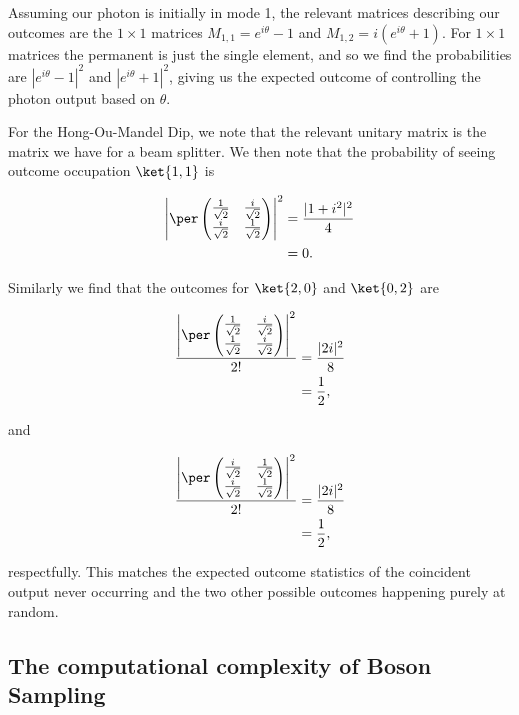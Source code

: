 Assuming our photon is initially in mode 1, the relevant matrices describing our outcomes are the $1\times 1$ matrices $M_{1,1} = e^{i\theta}-1$ and $M_{1,2} = i(e^{i\theta}+1)$. For $1\times 1$ matrices the permanent is just the single element, and so we find the probabilities are $|e^{i\theta}-1|^2$ and $|e^{i\theta}+1|^2$, giving us the expected outcome of controlling the photon output based on $\theta$.

For the Hong-Ou-Mandel Dip, we note that the relevant unitary matrix is the matrix we have for a beam splitter. We then note that the probability of seeing outcome occupation $\ket{1,1}$ is

\begin{align}
\left|\per\begin{pmatrix}\frac{1}{\sqrt{2}}&\frac{i}{\sqrt{2}}\\\frac{i}{\sqrt{2}}&\frac{1}{\sqrt{2}}\end{pmatrix}\right|^2 &= \frac{|1+i^2|^2}{4}\\
&= 0.
\end{align}

Similarly we find that the outcomes for $\ket{2,0}$ and $\ket{0,2}$ are

\begin{align}
\frac{\left|\per\begin{pmatrix}\frac{1}{\sqrt{2}}&\frac{i}{\sqrt{2}}\\\frac{1}{\sqrt{2}}&\frac{i}{\sqrt{2}}\end{pmatrix}\right|^2}{2!} &= \frac{|2i|^2}{8}\\
&= \frac{1}{2},
\end{align}

\noindent and

\begin{align}
\frac{\left|\per\begin{pmatrix}\frac{i}{\sqrt{2}}&\frac{1}{\sqrt{2}}\\\frac{i}{\sqrt{2}}&\frac{1}{\sqrt{2}}\end{pmatrix}\right|^2}{2!} &= \frac{|2i|^2}{8}\\
&= \frac{1}{2},
\end{align}

\noindent respectfully. This matches the expected outcome statistics of the coincident output never occurring and the two other possible outcomes happening purely at random.

\subsection{The computational complexity of Boson Sampling}
\label{ssec:cc-bs}

